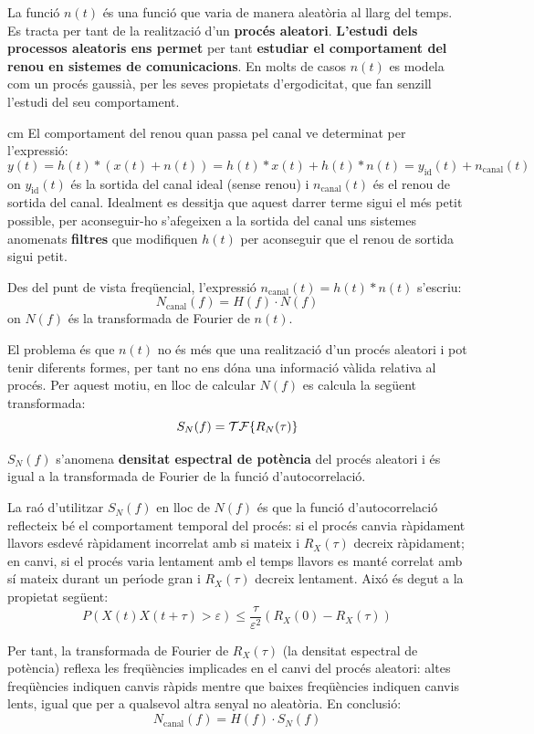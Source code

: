 \documentclass{article}
\begin{document}
La funci\'o $n(t)$ \'es una funci\'o que varia de manera aleat\`oria al llarg del temps. Es tracta per tant
de la realitzaci\'o d'un {\bf proc\'es aleatori}. {\bf L'estudi dels processos aleatoris ens permet} per tant 
{\bf estudiar el comportament del renou en sistemes de comunicacions}.
En molts de casos $n(t)$ es modela com un proc\'es gaussi\`a, per les seves propietats d'ergodicitat, que fan senzill
l'estudi del seu comportament.

 cm
El comportament del renou quan passa pel canal ve determinat per l'expressi\'o:
\[
y(t)=h(t) \ast (x(t) + n(t)) = h(t) \ast x(t) + h(t) \ast n(t) = y_{\mathrm{id}}(t) + n_{\mathrm{canal}}(t)
\]
\noindent
on $y_{\mathrm{id}}(t)$ \'es la sortida del canal ideal (sense renou) i $n_{\mathrm{canal}}(t)$ \'es el renou de
sortida del canal. Idealment es dessitja que aquest darrer terme sigui el m\'es petit possible, per aconseguir-ho
s'afegeixen a la sortida del canal uns sistemes anomenats {\bf filtres} que modifiquen $h(t)$ per aconseguir que el 
renou de sortida sigui petit.

Des del punt de vista freq\"uencial, l'expressi\'o $n_{\mathrm{canal}}(t)=h(t) \ast n(t)$ s'escriu:
\[
N_{\mathrm{canal}}(f)=H(f) \cdot N(f)
\]
\noindent
on $N(f)$ \'es la transformada de Fourier de $n(t)$.

El problema \'es que $n(t)$ no \'es m\'es que una realitzaci\'o d'un proc\'es aleatori i pot tenir diferents formes,
per tant no ens d\'ona una informaci\'o v\`alida relativa al proc\'es. Per aquest motiu, en lloc de calcular $N(f)$
es calcula la seg\"uent transformada:
\[
S_N(f)={\cal TF}\{R_N(\tau)\}
\]

$S_N(f)$ s'anomena {\bf densitat espectral de pot\`encia} del proc\'es aleatori i \'es igual a la transformada
de Fourier de la funci\'o d'autocorrelaci\'o.

La ra\'o d'utilitzar $S_N(f)$ en lloc de $N(f)$ \'es que la funci\'o d'autocorrelaci\'o reflecteix b\'e el comportament
temporal del proc\'es: si el proc\'es canvia r\`apidament llavors esdev\'e r\`apidament incorrelat amb si mateix
i $R_X(\tau)$ decreix r\`apidament; en canvi, si el proc\'es varia lentament amb el temps llavors es mant\'e correlat
amb s\'i mateix durant un per\'\i ode gran i $R_X(\tau)$ decreix lentament. Aix\'o \'es degut a la propietat seg\"uent:
\[
P(X(t) X(t+\tau) > \varepsilon) \leq \frac{\tau}{\varepsilon^2} (R_X(0)-R_X(\tau))
\]

Per tant, la transformada de Fourier de $R_X(\tau)$ (la densitat espectral de pot\`encia) reflexa les freq\"u\`encies
implicades en el canvi del proc\'es aleatori: altes freq\"u\`encies indiquen canvis r\`apids mentre que baixes
freq\"u\`encies indiquen canvis lents, igual que per a qualsevol altra senyal no aleat\`oria. En conclusi\'o:
\[
N_{\mathrm{canal}}(f)=H(f) \cdot S_N(f)
\]
\end{document}
